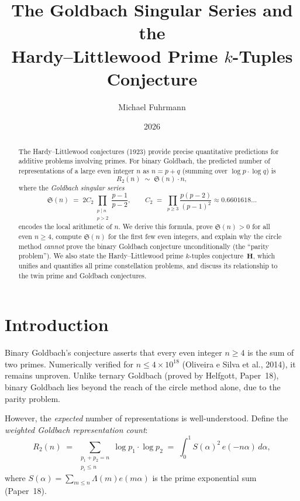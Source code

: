 \documentclass[12pt,a4paper]{amsart}
\theoremstyle{definition}
\newcommand{\eq}[1]{e\!\left(#1\right)}
\begin{document}
\title{The Goldbach Singular Series and the\\
       Hardy--Littlewood Prime $k$-Tuples Conjecture}

\author{Michael Fuhrmann}
\address{Specialist Mathematics Project, Build 80}
\date{2026}

\begin{abstract}
The Hardy--Littlewood conjectures (1923) provide precise quantitative
predictions for additive problems involving primes.  For binary Goldbach,
the predicted number of representations of a large even integer $n$ as
$n = p + q$ (summing over $\log p \cdot \log q$) is
\[
  R_2(n) \;\sim\; \mathfrak{S}(n) \cdot n,
\]
where the \emph{Goldbach singular series}
\[
  \mathfrak{S}(n)
  \;=\; 2 C_2 \prod_{\substack{p \mid n \\ p > 2}} \frac{p-1}{p-2},
  \qquad
  C_2 \;=\; \prod_{p \geq 3} \frac{p(p-2)}{(p-1)^2} \approx 0.6601618\ldots
\]
encodes the local arithmetic of $n$.  We derive this formula, prove
$\mathfrak{S}(n) > 0$ for all even $n \geq 4$, compute $\mathfrak{S}(n)$
for the first few even integers, and explain why the circle method
\emph{cannot} prove the binary Goldbach conjecture unconditionally
(the ``parity problem'').  We also state the Hardy--Littlewood prime
$k$-tuples conjecture~$\mathbf{H}$, which unifies and quantifies all
prime constellation problems, and discuss its relationship to the
twin prime and Goldbach conjectures.
\end{abstract}

\maketitle
\tableofcontents

\section{Introduction}

Binary Goldbach's conjecture asserts that every even integer $n \geq 4$
is the sum of two primes.  Numerically verified for $n \leq 4 \times 10^{18}$
(Oliveira e Silva et al., 2014), it remains unproven.  Unlike ternary
Goldbach (proved by Helfgott, Paper~18), binary Goldbach lies beyond the
reach of the circle method alone, due to the parity problem.

However, the \emph{expected} number of representations is well-understood.
Define the \emph{weighted Goldbach representation count}:
\[
  R_2(n) \;=\; \sum_{\substack{p_1 + p_2 = n \\ p_i \leq n}} \log p_1 \cdot \log p_2
  \;=\; \int_0^1 S(\alpha)^2\, \eq{-n\alpha}\, d\alpha,
\]
where $S(\alpha) = \sum_{m \leq n} \Lambda(m) \eq{m\alpha}$ is the prime
exponential sum (Paper~18).
\end{document}
